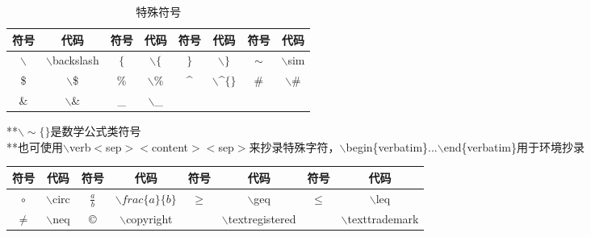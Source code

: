 \documentclass[UTF8,fontset=ubuntu]{ctexart}
\begin{document}
\begin{table}
\begin{tabular}{|c|c|c|c|c|c|c|c|}
	\hline
	符号 & 代码 & 符号 & 代码 & 符号 & 代码 & 符号 & 代码\\
	\hline
	$\backslash$ & $\backslash$backslash & $\{$ & $\backslash\{$ & $\}$ & $\backslash\}$ & $\sim$ & $\backslash$sim\\
	\hline
	\$ & $\backslash$\$ & \% & $\backslash$\% & \^{} & $\backslash$\^{}$\{\}$ & \# & $\backslash$\#\\
	\hline
	\& & $\backslash$\& & \_ & $\backslash$\_\\
	\hline
\end{tabular}\par
**$\backslash \sim \{ \}$是数学公式类符号\\
**也可使用$\backslash$verb$<$sep$><$content$><$sep$>$来抄录特殊字符，$\backslash$begin\{verbatim\}...$\backslash$end\{verbatim\}用于环境抄录\\
\caption{特殊符号}
\end{table}
\begin{tabular}{|c|c|c|c|c|c|c|c|}
	\hline
	符号 & 代码 & 符号 & 代码 & 符号 & 代码 & 符号 & 代码\\
	\hline
	$\circ$ & $\backslash$circ & $\frac{a}{b}$ & $\backslash frac\{a\}\{b\}$ & $\geq$ & $\backslash$geq & $\leq$ & $\backslash$leq\\
	\hline
	$\neq$ & $\backslash$neq & \copyright & $\backslash$copyright & \textregistered & $\backslash$textregistered & \texttrademark & $\backslash$texttrademark\\
	\hline
\end{tabular}
\end{document}
